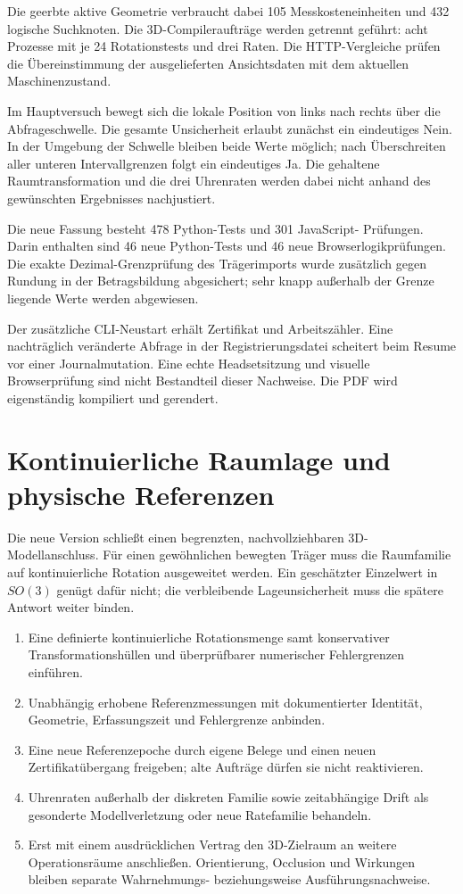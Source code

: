 \documentclass[11pt,a4paper]{article}
\newcommand{\nextsection}[2]{\clearpage{\color{accent}\small\textsf{#1}}\section{#2}}
\begin{document}
Die geerbte aktive Geometrie verbraucht dabei 105 Messkosteneinheiten
und 432 logische Suchknoten. Die 3D-Compileraufträge werden getrennt
geführt: acht Prozesse mit je 24 Rotationstests und drei Raten.
Die HTTP-Vergleiche prüfen die Übereinstimmung der ausgelieferten
Ansichtsdaten mit dem aktuellen Maschinenzustand.

Im Hauptversuch bewegt sich die lokale Position von links nach
rechts über die Abfrageschwelle. Die gesamte Unsicherheit erlaubt
zunächst ein eindeutiges Nein. In der Umgebung der Schwelle bleiben
beide Werte möglich; nach Überschreiten aller unteren Intervallgrenzen
folgt ein eindeutiges Ja. Die gehaltene Raumtransformation und die
drei Uhrenraten werden dabei nicht anhand des gewünschten Ergebnisses
nachjustiert.

Die neue Fassung besteht 478 Python-Tests und 301 JavaScript-
Prüfungen. Darin enthalten sind 46 neue Python-Tests und 46 neue
Browserlogikprüfungen. Die exakte Dezimal-Grenzprüfung des Trägerimports
wurde zusätzlich gegen Rundung in der Betragsbildung abgesichert;
sehr knapp außerhalb der Grenze liegende Werte werden abgewiesen.

Der zusätzliche CLI-Neustart erhält Zertifikat und Arbeitszähler.
Eine nachträglich veränderte Abfrage in der Registrierungsdatei
scheitert beim Resume vor einer Journalmutation. Eine echte
Headsetsitzung und visuelle Browserprüfung sind nicht Bestandteil
dieser Nachweise. Die PDF wird eigenständig kompiliert und gerendert.

\nextsection{97 / NÄCHSTER NACHWEIS}{Kontinuierliche Raumlage und physische Referenzen}
Die neue Version schließt einen begrenzten, nachvollziehbaren
3D-Modellanschluss. Für einen gewöhnlichen bewegten Träger muss
die Raumfamilie auf kontinuierliche Rotation ausgeweitet werden.
Ein geschätzter Einzelwert in $SO(3)$ genügt dafür nicht; die
verbleibende Lageunsicherheit muss die spätere Antwort weiter binden.

\begin{enumerate}
\item Eine definierte kontinuierliche Rotationsmenge samt konservativer
Transformationshüllen und überprüfbarer numerischer Fehlergrenzen einführen.
\item Unabhängig erhobene Referenzmessungen mit dokumentierter
Identität, Geometrie, Erfassungszeit und Fehlergrenze anbinden.
\item Eine neue Referenzepoche durch eigene Belege und einen neuen
Zertifikatübergang freigeben; alte Aufträge dürfen sie nicht reaktivieren.
\item Uhrenraten außerhalb der diskreten Familie sowie zeitabhängige
Drift als gesonderte Modellverletzung oder neue Ratefamilie behandeln.
\item Erst mit einem ausdrücklichen Vertrag den 3D-Zielraum an weitere
Operationsräume anschließen. Orientierung, Occlusion und Wirkungen
bleiben separate Wahrnehmungs- beziehungsweise Ausführungsnachweise.
\end{enumerate}
\end{document}
